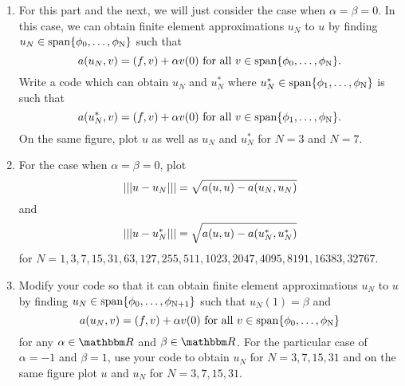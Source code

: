 \begin{enumerate}
\item For this part and the next, we will just consider the case when $\alpha=\beta=0$. In this case, we can obtain finite element approximations $u_N$ to $u$ by finding $u_N\in\rm{span}\{\phi_0,\ldots,\phi_N\}$ such that
\[
a(u_N,v)=(f,v)+\alpha v(0)\mbox{ for all }v\in\rm{span}\{\phi_0,\ldots,\phi_N\}.
\]
Write a code which can obtain $u_N$ and $u_N^*$ where $u_N^*\in\rm{span}\{\phi_1,\ldots,\phi_N\}$ is such that
\[
a(u_N^*,v)=(f,v)+\alpha v(0)\mbox{ for all }v\in\rm{span}\{\phi_1,\ldots,\phi_N\}.
\]
On the same figure, plot $u$ as well as $u_N$ and $u^*_N$ for $N=3$ and $N=7$.
\\
\item For the case when $\alpha=\beta=0$, plot
\[
\left|\left|\left|u-u_N\right|\right|\right|=\sqrt{a(u,u)-a(u_N,u_N)}
\]
and
\[
\left|\left|\left|u-u^*_N\right|\right|\right|=\sqrt{a(u,u)-a(u^*_N,u^*_N)}
\]
for $N=1,3,7,15,31,63,127,255,511,1023,2047,4095,8191,16383,32767$.
\\
\item Modify your code so that it can obtain finite element approximations $u_N$ to $u$ by finding $u_N\in\rm{span}\{\phi_0,\ldots,\phi_{N+1}\}$ such that $u_N(1)=\beta$ and
\[
a(u_N,v)=(f,v)+\alpha v(0)\mbox{ for all }v\in\rm{span}\{\phi_0,\ldots,\phi_N\}
\]
for any $\alpha\in\R$ and $\beta\in\R$. For the particular case of $\alpha = -1$ and $\beta = 1$, use your code to obtain $u_N$ for $N=3,7,15,31$ and on the same figure plot $u$ and $u_N$ for $N=3,7,15,31$.
\end{enumerate}




